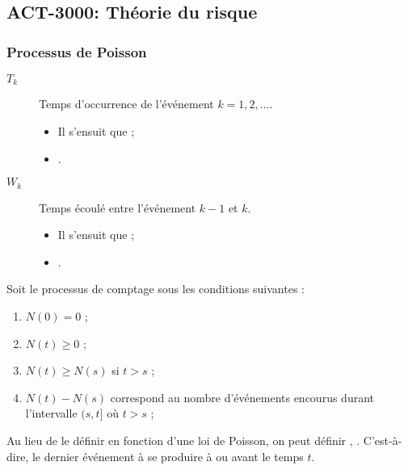 \documentclass[10pt, french]{article}
\begin{document}
\begin{multicols*}{2}
\newpage
\part{ACT-3000: Théorie du risque}
\setcounter{section}{9}
\section{Processus de Poisson}
\begin{distributions}[Notation]
\begin{description}
	\item[$T_{k}$]	Temps d'occurrence de l'événement $k	=	1, 2, \dots$.
		\begin{itemize}
		\item	Il s'ensuit que  ;
		\item	{}.
		\end{itemize}
	\item[$W_{k}$]	Temps écoulé entre l'événement $k - 1$ et $k$.
		\begin{itemize}
		\item	Il s'ensuit que  ;
		\item	{}.
		\end{itemize}
\end{description}
\end{distributions}

\begin{definitionNOHFILL}
Soit le processus de comptage  sous les conditions suivantes :
\begin{enumerate}
	\item	$N(0)	=	0$ ;
	\item	$N(t)	\geq	0$ ;
	\item	$N(t)	\geq	N(s)$ si $t	>	s$ ;
	\item	$N(t) - N(s)$ correspond au nombre d'événements encourus durant l'intervalle $(s, t]$ où $t	>	s$ ;
\end{enumerate}

Au lieu de le définir en fonction d'une loi de Poisson, on peut définir , . C'est-à-dire, le dernier événement à se produire à ou avant le temps $t$.

\tcbline


\end{definitionNOHFILL}
\end{multicols*}
\end{document}

